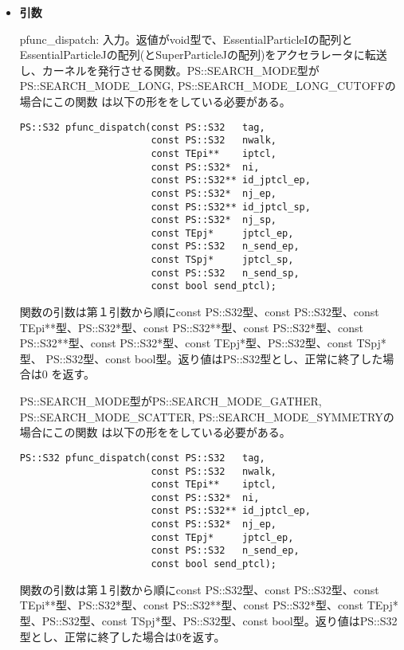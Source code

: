 \begin{itemize}

\item {\bf 引数}

pfunc\_dispatch: 入力。返値がvoid型で、EssentialParticleIの配列と
EssentialParticleJの配列(とSuperParticleJの配列)をアクセラレータに転送
し、カーネルを発行させる関数。PS::SEARCH\_MODE型が
PS::SEARCH\_MODE\_LONG, PS::SEARCH\_MODE\_LONG\_CUTOFFの場合にこの関数
は以下の形ををしている必要がある。

\begin{verbatim}
PS::S32 pfunc_dispatch(const PS::S32   tag,
                       const PS::S32   nwalk,
                       const TEpi**    iptcl,
                       const PS::S32*  ni,
                       const PS::S32** id_jptcl_ep,
                       const PS::S32*  nj_ep,
                       const PS::S32** id_jptcl_sp,
                       const PS::S32*  nj_sp,
                       const TEpj*     jptcl_ep,
                       const PS::S32   n_send_ep,
                       const TSpj*     jptcl_sp,
                       const PS::S32   n_send_sp,
                       const bool send_ptcl);
\end{verbatim}

関数の引数は第１引数から順にconst PS::S32型、const PS::S32型、const
TEpi**型、PS::S32*型、const PS::S32**型、const PS::S32*型、const
PS::S32**型、const PS::S32*型、const TEpj*型、PS::S32型、const TSpj*型、
PS::S32型、const bool型。返り値はPS::S32型とし、正常に終了した場合は0
を返す。

PS::SEARCH\_MODE型がPS::SEARCH\_MODE\_GATHER,
PS::SEARCH\_MODE\_SCATTER, PS::SEARCH\_MODE\_SYMMETRYの場合にこの関数
は以下の形ををしている必要がある。

\begin{verbatim}
PS::S32 pfunc_dispatch(const PS::S32   tag,
                       const PS::S32   nwalk,
                       const TEpi**    iptcl,
                       const PS::S32*  ni,
                       const PS::S32** id_jptcl_ep,
                       const PS::S32*  nj_ep,
                       const TEpj*     jptcl_ep,
                       const PS::S32   n_send_ep,
                       const bool send_ptcl);
\end{verbatim}

関数の引数は第１引数から順にconst PS::S32型、const PS::S32型、const
TEpi**型、PS::S32*型、const PS::S32**型、const PS::S32*型、const TEpj*
型、PS::S32型、const TSpj*型、PS::S32型、const bool型。返り値はPS::S32
型とし、正常に終了した場合は0を返す。


\end{itemize}
